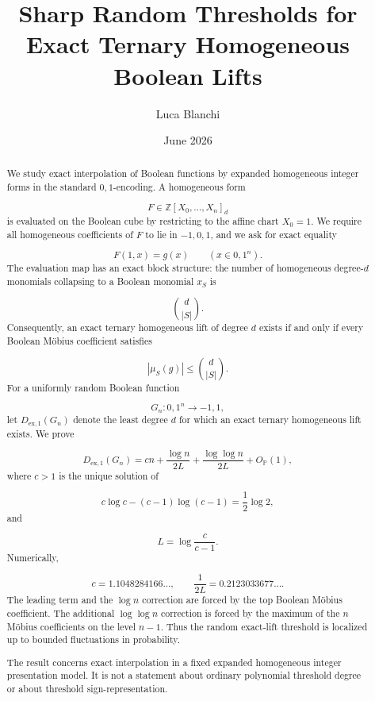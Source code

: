 \documentclass[11pt]{article}
\theoremstyle{definition}
\begin{document}
\title{Sharp Random Thresholds for Exact Ternary Homogeneous Boolean Lifts}
\author{Luca Blanchi}
\date{June 2026}

\maketitle

\begin{abstract}
We study exact interpolation of Boolean functions by expanded homogeneous integer forms in the standard ${0,1}$-encoding. A homogeneous form

\[
F\in\mathbb{Z}[X_0,\dots,X_n]_d
\]
is evaluated on the Boolean cube by restricting to the affine chart $X_0=1$. We require all homogeneous coefficients of $F$ to lie in ${-1,0,1}$, and we ask for exact equality

\[
F(1,x)=g(x)
\qquad(x\in{0,1}^n).
\]
The evaluation map has an exact block structure: the number of homogeneous degree-$d$ monomials collapsing to a Boolean monomial $x_S$ is

\[
\binom d{|S|}.
\]
Consequently, an exact ternary homogeneous lift of degree $d$ exists if and only if every Boolean Möbius coefficient satisfies

\[
|\mu_S(g)|\le \binom d{|S|}.
\]
For a uniformly random Boolean function

\[
G_n:{0,1}^n\to{-1,1},
\]
let $D_{\mathrm{ex},1}(G_n)$ denote the least degree $d$ for which an exact ternary homogeneous lift exists. We prove

\[
D_{\mathrm{ex},1}(G_n)
=
cn+
\frac{\log n}{2L}
+
\frac{\log\log n}{2L}
+
O_{\mathbb{P}}(1),
\]
where $c>1$ is the unique solution of

\[
c\log c-(c-1)\log(c-1)=\frac12\log2,
\]
and

\[
L=\log\frac c{c-1}.
\]
Numerically,

\[
c=1.1048284166\ldots,
\qquad
\frac1{2L}=0.2123033677\ldots.
\]
The leading term and the $\log n$ correction are forced by the top Boolean Möbius coefficient. The additional $\log\log n$ correction is forced by the maximum of the $n$ Möbius coefficients on the level $n-1$. Thus the random exact-lift threshold is localized up to bounded fluctuations in probability.

The result concerns exact interpolation in a fixed expanded homogeneous integer presentation model. It is not a statement about ordinary polynomial threshold degree or about threshold sign-representation.

\end{abstract}
\end{document}
